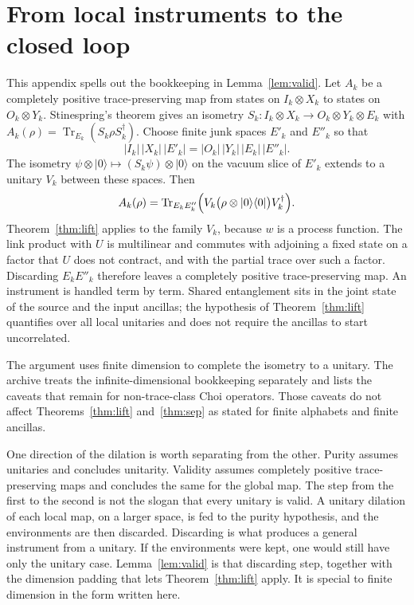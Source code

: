 \documentclass[11pt]{article}
\theoremstyle{definition}
\theoremstyle{remark}
\newcommand{\ket}[1]{\lvert #1\rangle}
\newcommand{\bra}[1]{\langle #1\rvert}
\begin{document}
\section{From local instruments to the closed loop}
\label{app:valid}

This appendix spells out the bookkeeping in Lemma~\ref{lem:valid}. Let \(A_k\) be a completely positive trace-preserving map from states on \(I_k\otimes X_k\) to states on \(O_k\otimes Y_k\). Stinespring's theorem \cite{stinespring1955} gives an isometry \(S_k:I_k\otimes X_k\to O_k\otimes Y_k\otimes E_k\) with \(A_k(\rho)=\operatorname{Tr}_{E_k}(S_k\rho S_k^{\dagger})\). Choose finite junk spaces \(E'_k\) and \(E''_k\) so that
\[
|I_k|\,|X_k|\,|E'_k|=|O_k|\,|Y_k|\,|E_k|\,|E''_k|.
\]
The isometry \(\psi\otimes\ket{0}\mapsto (S_k\psi)\otimes\ket{0}\) on the vacuum slice of \(E'_k\) extends to a unitary \(V_k\) between these spaces. Then
\[
A_k(\rho)=\operatorname{Tr}_{E_k E''_k}\Bigl(V_k\bigl(\rho\otimes\ket{0}\bra{0}\bigr)V_k^{\dagger}\Bigr).
\]
Theorem~\ref{thm:lift} applies to the family \(V_k\), because \(w\) is a process function. The link product with \(U\) is multilinear and commutes with adjoining a fixed state on a factor that \(U\) does not contract, and with the partial trace over such a factor. Discarding \(E_k E''_k\) therefore leaves a completely positive trace-preserving map. An instrument is handled term by term. Shared entanglement sits in the joint state of the source and the input ancillas; the hypothesis of Theorem~\ref{thm:lift} quantifies over all local unitaries and does not require the ancillas to start uncorrelated.

The argument uses finite dimension to complete the isometry to a unitary. The archive treats the infinite-dimensional bookkeeping separately and lists the caveats that remain for non-trace-class Choi operators. Those caveats do not affect Theorems~\ref{thm:lift} and~\ref{thm:sep} as stated for finite alphabets and finite ancillas.

One direction of the dilation is worth separating from the other. Purity assumes unitaries and concludes unitarity. Validity assumes completely positive trace-preserving maps and concludes the same for the global map. The step from the first to the second is not the slogan that every unitary is valid. A unitary dilation of each local map, on a larger space, is fed to the purity hypothesis, and the environments are then discarded. Discarding is what produces a general instrument from a unitary. If the environments were kept, one would still have only the unitary case. Lemma~\ref{lem:valid} is that discarding step, together with the dimension padding that lets Theorem~\ref{thm:lift} apply. It is special to finite dimension in the form written here.
\end{document}
